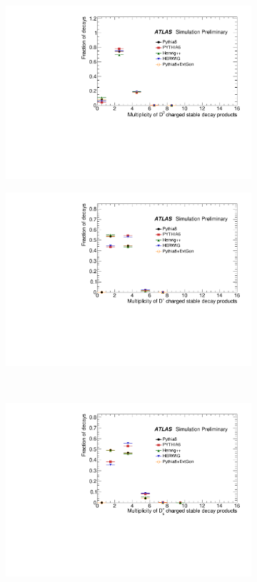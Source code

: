 \begin{figure}
\centering
\begin{subfigure}[]{0.45\textwidth}
\includegraphics[width=\textwidth]{evtgen/figures/EvtGen/D0/h_species_ncharge.pdf}
\end{subfigure}
\begin{subfigure}[]{0.45\textwidth}
\includegraphics[width=\textwidth]{evtgen/figures/EvtGen/D+/h_species_ncharge.pdf}
\end{subfigure}\\
\begin{subfigure}[]{0.45\textwidth}
\includegraphics[width=\textwidth]{evtgen/figures/EvtGen/Ds+/h_species_ncharge.pdf}

\end{subfigure}
\end{figure}
